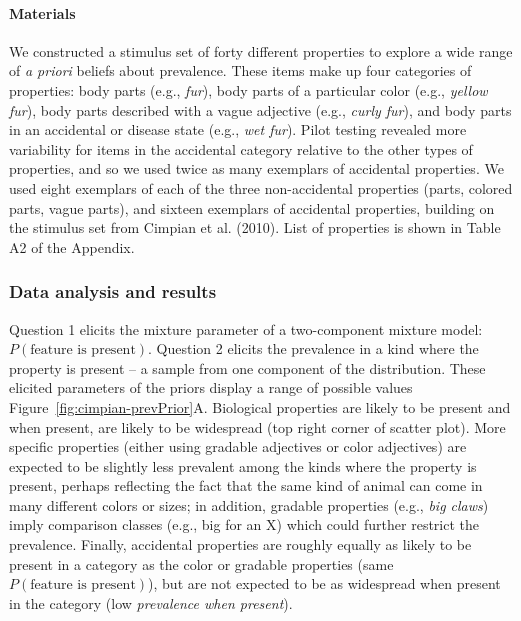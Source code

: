 \documentclass[floatsintext,man]{apa6}
\let\oldparagraph\paragraph
\renewcommand{\paragraph}[1]{\oldparagraph{#1}\mbox{}}
\begin{document}
\paragraph{Materials}
We constructed a stimulus set of forty different properties to explore a
wide range of \emph{a priori} beliefs about prevalence. These items make
up four categories of properties: body parts (e.g., \emph{fur}), body
parts of a particular color (e.g., \emph{yellow fur}), body parts
described with a vague adjective (e.g., \emph{curly fur}), and body
parts in an accidental or disease state (e.g., \emph{wet fur}).
Pilot testing revealed more variability for items in the
accidental category relative to the other types of properties, and so we used
twice as many exemplars of accidental properties. We used eight exemplars of each of the three
non-accidental properties (parts, colored parts, vague parts), and
sixteen exemplars of accidental properties, building on the stimulus set
from Cimpian et al. (2010). List of properties is shown in Table A2 of
the Appendix.


\subsubsection{Data analysis and
results}\label{data-analysis-and-results}

Question 1 elicits the mixture parameter of a two-component mixture
model: \(P(\text{feature is present})\). Question 2 elicits the
prevalence in a kind where the property is present -- a sample from one component of the distribution. These elicited
parameters of the priors display a range of possible values
Figure~\ref{fig:cimpian-prevPrior}A. Biological properties are likely to
be present and when present, are likely to be widespread (top right
corner of scatter plot). More specific properties (either using gradable
adjectives or color adjectives) are expected to be slightly less
prevalent among the kinds where the property is present, perhaps
reflecting the fact that the same kind of animal can come in many
different colors or sizes; in addition, gradable properties (e.g., \emph{big claws}) imply comparison classes (e.g., big for an X) which could further restrict the prevalence. Finally, accidental properties
are roughly equally as likely to be present in a category as the color or gradable
properties (same \(P(\text{feature is present})\)), but are not expected
to be as widespread when present in the category (low \emph{prevalence
when present}).
\end{document}
